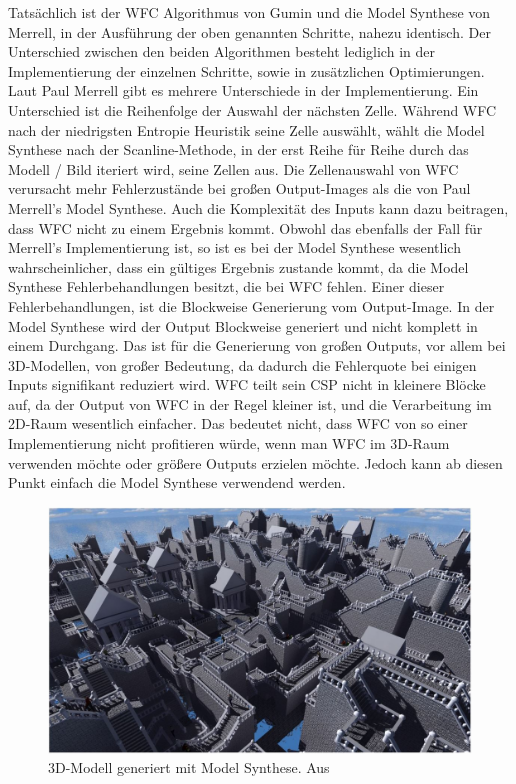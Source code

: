 \documentclass[12pt, a4paper,twoside,openright]{report} %
\begin{document}
Tatsächlich ist der WFC Algorithmus von Gumin und die Model Synthese von Merrell, in der Ausführung der oben genannten Schritte, nahezu identisch.
Der Unterschied zwischen den beiden Algorithmen besteht lediglich in der Implementierung der einzelnen Schritte, sowie in zusätzlichen Optimierungen.
Laut Paul Merrell gibt es mehrere Unterschiede in der Implementierung.
Ein Unterschied ist die Reihenfolge der Auswahl der nächsten Zelle.
Während WFC nach der niedrigsten Entropie Heuristik seine Zelle auswählt,
wählt die Model Synthese nach der Scanline-Methode, in der erst Reihe für Reihe durch das Modell / Bild iteriert wird, seine Zellen aus.
Die Zellenauswahl von WFC verursacht mehr Fehlerzustände bei großen Output-Images als die von Paul Merrell's Model Synthese.
Auch die Komplexität des Inputs kann dazu beitragen, dass WFC nicht zu einem Ergebnis kommt.
Obwohl das ebenfalls der Fall für Merrell's Implementierung ist, so ist es bei der Model Synthese wesentlich wahrscheinlicher, dass ein gültiges Ergebnis zustande kommt,
da die Model Synthese Fehlerbehandlungen besitzt, die bei WFC fehlen.
\newline
Einer dieser Fehlerbehandlungen, ist die Blockweise Generierung vom Output-Image.
In der Model Synthese wird der Output Blockweise generiert und nicht komplett in einem Durchgang.
Das ist für die Generierung von großen Outputs, vor allem bei 3D-Modellen, von großer Bedeutung, da dadurch die Fehlerquote bei einigen Inputs signifikant reduziert wird.
WFC teilt sein CSP nicht in kleinere Blöcke auf, da der Output von WFC in der Regel kleiner ist, und die Verarbeitung im 2D-Raum wesentlich einfacher.
Das bedeutet nicht, dass WFC von so einer Implementierung nicht profitieren würde, wenn man WFC im 3D-Raum verwenden möchte oder größere Outputs erzielen möchte.
Jedoch kann ab diesen Punkt einfach die Model Synthese verwendend werden. \cite{merrell2018compare}

\begin{figure}[H]
    \centering
    \includegraphics[width=1\linewidth]{images/3D-model-synthese.JPG}%
    \caption{3D-Modell generiert mit Model Synthese. Aus \cite{merrell2018compare}}%
\end{figure}
\end{document}
